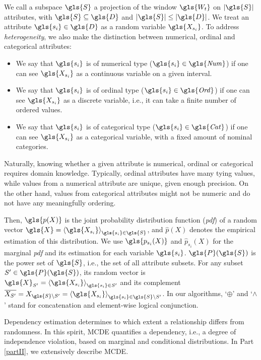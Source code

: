 We call a subspace $\gls{S}$ a projection of the window $\gls{W_t}$ on $|\gls{S}|$ attributes, with $\gls{S} \subseteq \gls{D}$ and $|\gls{S}| \leq |\gls{D}|$. 
We treat an attribute $\gls{s_i} \in \gls{D}$ as a random variable $\gls{X_{s_i}}$.  To address \textit{heterogeneity}, we also make the distinction between numerical, ordinal and categorical attributes:
\begin{itemize}[noitemsep]
	\item We say that $\gls{s_i}$ is of numerical type ($\gls{s_i} \in \mathit{\gls{Num}}$) 
	if one can see $\gls{X_{s_i}}$ as a continuous variable on a given interval. 
	\item We say that $\gls{s_i}$ is of ordinal type ($\gls{s_i} \in \mathit{\gls{Ord}}$) if one can see  $\gls{X_{s_i}}$ as a discrete variable, i.e., it can take a finite number of ordered values.
	\item We say that $\gls{s_i}$ is of categorical type ($\gls{s_i} \in \mathit{\gls{Cat}}$) if  one can see $\gls{X_{s_i}}$ as a categorical variable, with a fixed amount of nominal categories.
\end{itemize}

Naturally, knowing whether a given attribute is numerical, ordinal or categorical requires domain knowledge. Typically, ordinal attributes have many tying values, while values from a numerical attribute are unique, given enough precision. On the other hand, values from categorical attributes might not be numeric and do not have any meaningfully ordering. 

Then, $\gls{p(X)}$ is the joint probability distribution function (\textit{pdf}) of a random vector $\gls{X} = \left \langle \gls{X_{s_i}}\right \rangle  _{\gls{s_i} \in \gls{S}}$, and $\hat{p}(X)$ denotes the empirical estimation of this distribution. 
We use $\gls{p_{s_{i}}(X)}$ and $\hat{p}_{s_{i}}(X)$ for the marginal \textit{pdf} and its estimation for each variable $\gls{s_i}$.
$\gls{P}(\gls{S})$ is the power set of $\gls{S}$, i.e., the set of all attribute subsets. 
For any subset $S' \in \gls{P}(\gls{S})$, its random vector is $\gls{X}_{S'}= \left \langle \gls{X_{s_i}}\right \rangle _{\gls{s_i} \in S'}$ and its complement $\overline{X_{S'}} = X_{\gls{S}  \setminus S'} = \left \langle \gls{X_{s_i}}\right \rangle _{\gls{s_i} \in \gls{S} \setminus S'}$. 
In our algorithms, `$\oplus$' and `$\wedge$' stand for concatenation and element-wise logical conjunction. 

Dependency estimation determines to which extent a relationship differs from randomness. In this spirit, \gls{MCDE} quantifies a dependency, i.e., a degree of independence violation, based on marginal and conditional distributions. In Part \ref{partII}, we extensively describe \gls{MCDE}. 

